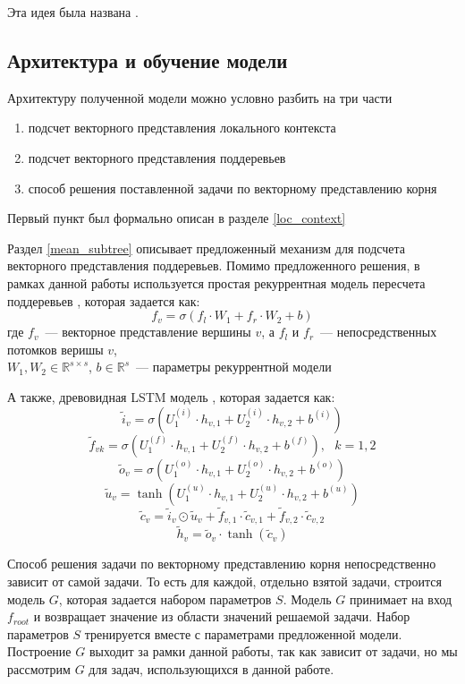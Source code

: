Эта идея была названа .

\subsection{Архитектура и обучение модели} \label{arch}

Архитектуру полученной модели можно условно разбить на три части
\begin{enumerate}
    \item{подсчет векторного представления локального контекста}
    \item{подсчет векторного представления поддеревьев}
    \item{способ решения поставленной задачи по векторному представлению корня}
\end{enumerate}

Первый пункт был формально описан в разделе \ref{loc_context}

Раздел \ref{mean_subtree} описывает предложенный механизм для подсчета векторного представления поддеревьев.
Помимо предложенного решения, в рамках данной работы используется простая рекуррентная модель пересчета поддеревьев \cite{SocherEtAl2011:RNN}, которая задается как:
$$f_v = \sigma(f_l \cdot W_1 + f_r \cdot W_2 + b)$$
где $f_v$~--- векторное представление вершины $v$, а $f_l$ и $f_r$~--- непосредственных
потомков веришы $v$,\\
$W_1, W_2 \in \mathbb{R}^{s \times s}$,
$b \in \mathbb{R}^s$~--- параметры рекуррентной модели

А также, древовидная LSTM модель \cite{DBLP:journals/corr/TaiSM15}, которая задается как:
$$\tilde{i}_v=\sigma \left( U_1^{(i)} \cdot h_{v,1} + U_2^{(i)} \cdot h_{v,2} + b^{(i)} \right)$$
$$\tilde{f}_{vk}=\sigma \left( U_1^{(f)} \cdot h_{v,1} + U_2^{(f)} \cdot h_{v,2} + b^{(f)} \right),\text{ }k=1,2$$
$$\tilde{o}_{v}=\sigma \left( U_1^{(o)} \cdot h_{v,1} + U_2^{(o)} \cdot h_{v,2} + b^{(o)} \right)$$
$$\tilde{u}_{v}=\tanh \left( U_1^{(u)} \cdot h_{v,1} + U_2^{(u)} \cdot h_{v,2} + b^{(u)} \right)$$
$$\tilde{c}_v=\tilde{i}_v \odot \tilde{u}_v + \tilde{f}_{v,1} \cdot \tilde{c}_{v, 1} + \tilde{f}_{v,2} \cdot \tilde{c}_{v, 2}$$
$$\tilde{h}_v=\tilde{o}_v \cdot \tanh(\tilde{c}_v)$$

Способ решения задачи по векторному представлению корня непосредственно зависит от самой задачи.
То есть для каждой, отдельно взятой задачи, строится модель $G$, которая задается набором параметров $S$.
Модель $G$ принимает на вход $f_{root}$ и возвращает значение из области значений решаемой задачи. 
Набор параметров $S$ тренируется вместе с параметрами предложенной модели. Построение $G$ выходит за рамки данной работы, так как зависит от задачи, но мы рассмотрим $G$ для задач, использующихся в данной работе.

